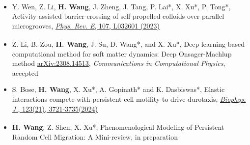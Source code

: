 \documentclass[a4paper,10pt]{extarticle}
\begin{document}
\begin{itemize}[leftmargin=*]
\item Y. Wen\textsuperscript{\textbf{\textdagger}}, Z. Li\textsuperscript{\textbf{\textdagger}}, \textbf{H. Wang}, J. Zheng, J. Tang, P. Lai*, X. Xu*, P. Tong*, Activity-assisted barrier-crossing of self-propelled colloids over parallel microgrooves, 
\href{https://doi.org/10.1103/PhysRevE.107.L032601}{\emph{Phys. Rev. E}, 107, L032601 (2023)}

\item Z. Li\textsuperscript{\textbf{\textdagger}},
B. Zou\textsuperscript{\textbf{\textdagger}}, \textbf{H. Wang}, J. Su, D. Wang*, and X. Xu*, Deep
learning-based computational method for soft matter dynamics: Deep Onsager-Machlup method \href{https://doi.org/10.48550/arXiv.2308.14513}{arXiv:2308.14513}, \textit{Communications in Computational Physics}, accepted

\item S. Bose, \textbf{H. Wang}, 
X. Xu*, A. Gopinath* and K. Dasbiswas*, Elastic interactions compete with persistent cell motility to drive durotaxis, 
\href{https://doi.org/10.1016/j.bpj.2024.09.021}{\emph{Biophys. J.}, 123(21), 3721-3735(2024)}

\item \textbf{H. Wang}\textsuperscript{\textbf{\textdagger}},
Z. Shen\textsuperscript{\textbf{\textdagger}}, X. Xu*, Phenomenological Modeling of Persistent Random Cell Migration: A Mini-review, in preparation
\end{itemize}
\end{document}
